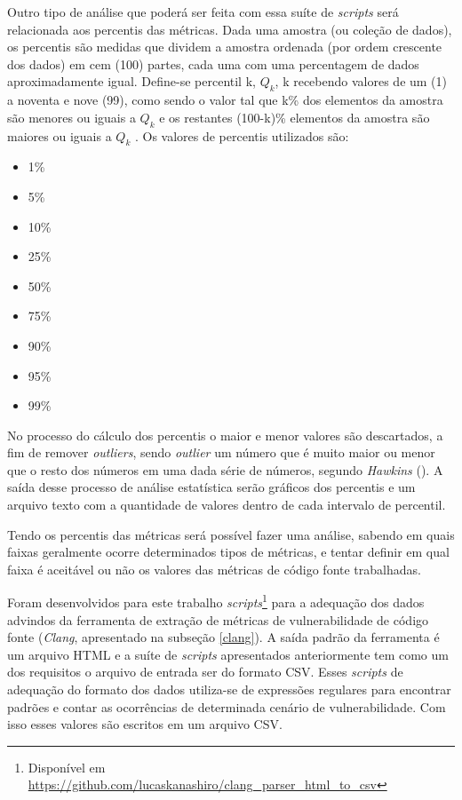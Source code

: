 Outro tipo de análise que poderá ser feita com essa suíte de \textit{scripts} será relacionada aos percentis das métricas.
Dada uma amostra (ou coleção de dados), os percentis são medidas que dividem a amostra ordenada (por ordem crescente dos dados) 
em cem (100) partes, cada uma com uma percentagem de dados aproximadamente igual. Define-se percentil k, ${Q_k}$, 
k recebendo valores de um (1) a noventa e nove (99), como sendo o valor tal que k\% dos elementos da amostra são menores ou 
iguais a ${Q_k}$ e os restantes (100-k)\% elementos da amostra são maiores ou iguais a ${Q_k}$ \cite{martins2013}. Os valores
de percentis utilizados são: 

\begin{multicols}{3}
  \begin{itemize}
    \item 1\%
    \item 5\%
    \item 10\%
    \item 25\%
    \item 50\%
    \item 75\%
    \item 90\%
    \item 95\%
    \item 99\%
  \end{itemize}
\end{multicols}

No processo do cálculo dos percentis o maior e menor valores são descartados, a
fim de remover \textit{outliers}, sendo \textit{outlier} um número que é muito maior 
ou menor que o resto dos números em uma dada série de números, segundo \emph{Hawkins}
(\citeyear{hawkins80}). A saída desse processo de análise estatística serão gráficos 
dos percentis e um arquivo texto com a quantidade de valores dentro de cada intervalo 
de percentil.

Tendo os percentis das métricas será possível fazer uma análise, sabendo em quais faixas geralmente ocorre 
determinados tipos de métricas, e tentar definir em qual faixa é aceitável ou não os valores das métricas de 
código fonte trabalhadas.

Foram desenvolvidos para este trabalho \textit{scripts}\footnote{Disponível em
\url{https://github.com/lucaskanashiro/clang\_parser\_html\_to\_csv}} para a adequação dos
dados advindos da ferramenta de extração de métricas de vulnerabilidade de
código fonte (\emph{Clang}, apresentado na subseção \ref{clang}). A saída padrão
da ferramenta é um arquivo HTML e a suíte de \textit{scripts} apresentados
anteriormente tem como um dos requisitos o arquivo de entrada ser do formato
CSV. Esses \textit{scripts} de adequação do formato dos dados utiliza-se de
expressões regulares para encontrar padrões e contar as ocorrências de
determinada cenário de vulnerabilidade. Com isso esses valores são escritos em
um arquivo CSV.

